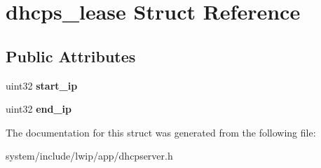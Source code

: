 \hypertarget{structdhcps__lease}{}\section{dhcps\+\_\+lease Struct Reference}
\label{structdhcps__lease}
\subsection*{Public Attributes}
\begin{DoxyCompactItemize}
\item 
\hypertarget{structdhcps__lease_a0b4d301e6eb86332afa43e0488492026}{}uint32 {\bfseries start\+\_\+ip}\label{structdhcps__lease_a0b4d301e6eb86332afa43e0488492026}

\item 
\hypertarget{structdhcps__lease_a9f82e2fe01b1e1e0abe25c513bfc2d10}{}uint32 {\bfseries end\+\_\+ip}\label{structdhcps__lease_a9f82e2fe01b1e1e0abe25c513bfc2d10}

\end{DoxyCompactItemize}


The documentation for this struct was generated from the following file\+:\begin{DoxyCompactItemize}
\item 
system/include/lwip/app/dhcpserver.\+h\end{DoxyCompactItemize}
